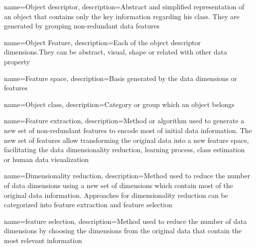 

{
        name=Object descriptor,
        description={Abstract and simplified representation of an object that contains only the key information regarding his class. They are generated by grouping non-redundant data features}
}

{
        name=Object Feature,
        description={Each of the object descriptor dimensions.They can be abstract, visual, shape or related with other data property}
}

{
        name=Feature space,
        description={Basis generated by the data dimensions or features}
}

{
        name=Object class,
        description={Category or group which an object belongs}
}

{
        name=Feature extraction,
        description={Method or algorithm used to generate a new set of non-redundant features to encode most of initial data information. The new set of features allow transforming the original data into a new feature space, facilitating the data dimensionality reduction, learning process, class estimation or human data visualization}
}

{
        name=Dimensionality reduction,
        description={Method used to reduce the number of data dimensions using a new set of dimensions which contain most of the original data information. Approaches for dimensionality reduction can be categorized into feature extraction and feature selection}
}

{
        name=feature selection,
        description={Method used to reduce the number of data dimensions by choosing the dimensions from the original data that contain the most relevant information}
}